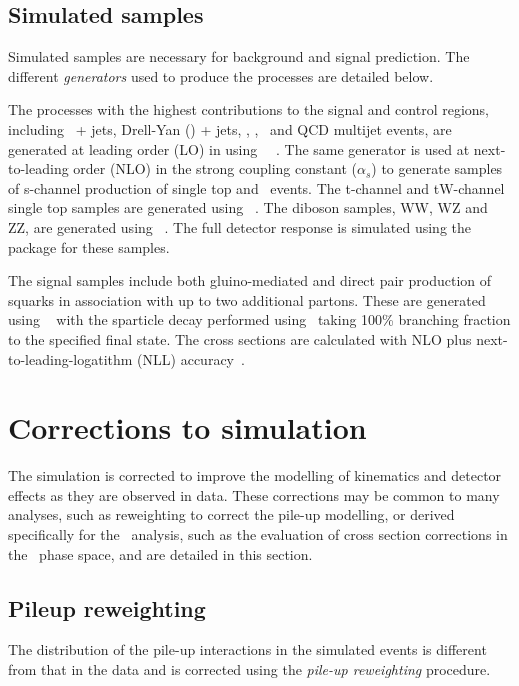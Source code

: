 \subsection{Simulated samples}

Simulated samples are necessary for background and signal prediction. 
The different \emph{generators} used to produce the processes are detailed below.

The processes with the highest contributions to the signal and control regions, 
including \znunu~+ jets, Drell-Yan (\dy) + jets, \gj, \ttj, \wj~and QCD multijet events, are generated at leading order (LO) 
in using \MADGRAPH~\AMCATNLO~\cite{Alwall:2014hca}. The same generator is used at next-to-leading order (NLO)
in the strong coupling constant ($\alpha_s$) to generate samples of s-channel production of single top and \ttV~events.
The t-channel and tW-channel single top samples are generated using \POWHEG~\cite{Alioli:2010xd}.
The diboson samples, WW, WZ and ZZ, are generated using \PYTHIA~\cite{PYTHIA}. 
The full detector response is simulated using the \GEANTfour~\cite{Agostinelli2003250} package for these samples.

The signal samples include both gluino-mediated and direct pair production of squarks in
association with up to two additional partons. These are generated using \MADGRAPH~\AMCATNLO
with the sparticle decay performed using \PYTHIA~taking 100\% branching fraction 
to the specified final state. The cross sections are calculated with
NLO plus next-to-leading-logatithm (NLL) accuracy~\cite{sparticleXs}. 


\section{Corrections to simulation}
\label{sec:corr-sim}
The simulation is corrected to improve the modelling of kinematics and detector effects 
as they are observed in data. These corrections may be common to many analyses,
such as reweighting to correct the pile-up modelling, or derived specifically for the \alphat~analysis, 
such as the evaluation of cross section corrections in the \alphat~phase space, 
and are detailed in this section.

\subsection{Pileup reweighting}
The distribution of the pile-up interactions in the simulated events is different from
that in the data and is corrected using the \emph{pile-up reweighting} procedure. 

